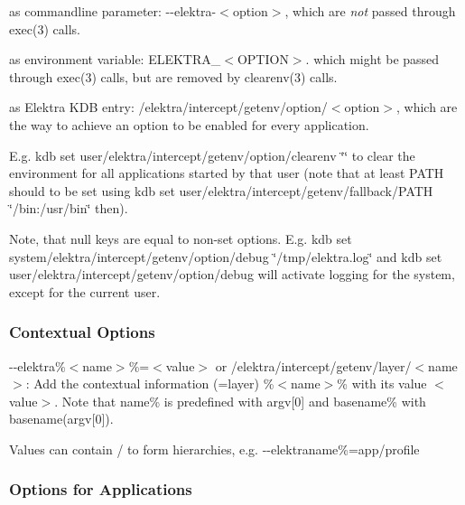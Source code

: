 \begin{DoxyEnumerate}
\item as commandline parameter\+: {\ttfamily -\/-\/elektra-\/$<$option$>$}, which are {\itshape not} passed through exec(3) calls.
\item as environment variable\+: {\ttfamily E\+L\+E\+K\+T\+R\+A\+\_\+$<$O\+P\+T\+I\+O\+N$>$}. which might be passed through exec(3) calls, but are removed by clearenv(3) calls.
\item as Elektra K\+D\+B entry\+: {\ttfamily /elektra/intercept/getenv/option/$<$option$>$}, which are the way to achieve an option to be enabled for every application.

E.\+g. {\ttfamily kdb set user/elektra/intercept/getenv/option/clearenv \char`\"{}\char`\"{}} to clear the environment for all applications started by that user (note that at least {\ttfamily P\+A\+T\+H} should to be set using {\ttfamily kdb set user/elektra/intercept/getenv/fallback/\+P\+A\+T\+H \char`\"{}/bin\+:/usr/bin\char`\"{}} then).

Note, that null keys are equal to non-\/set options. E.\+g. {\ttfamily kdb set system/elektra/intercept/getenv/option/debug \char`\"{}/tmp/elektra.\+log\char`\"{}} and {\ttfamily kdb set user/elektra/intercept/getenv/option/debug} will activate logging for the system, except for the current user.
\end{DoxyEnumerate}

\subsubsection*{Contextual Options}


\begin{DoxyItemize}
\item {\ttfamily -\/-\/elektra\%$<$name$>$\%=$<$value$>$} or {\ttfamily /elektra/intercept/getenv/layer/$<$name$>$}\+: Add the contextual information (=layer) {\ttfamily \%$<$name$>$\%} with its value {\ttfamily $<$value$>$}. Note that {\ttfamily name\%} is predefined with {\ttfamily argv\mbox{[}0\mbox{]}} and {\ttfamily basename\%} with {\ttfamily basename(argv\mbox{[}0\mbox{]})}.
\end{DoxyItemize}

Values can contain / to form hierarchies, e.\+g. {\ttfamily -\/-\/elektraname\%=app/profile}

\subsubsection*{Options for Applications}


